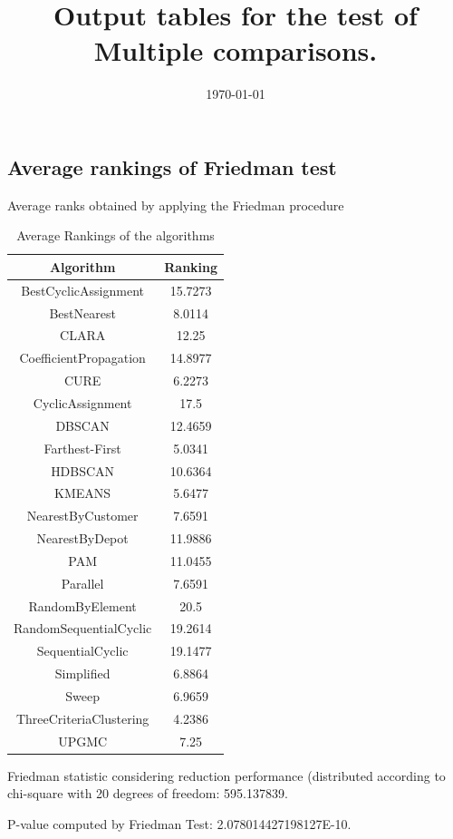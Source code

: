 \documentclass[a4paper,10pt]{article}
\title{Output tables for the test of Multiple comparisons.}
\author{}
\date{\today}
\begin{document}
\begin{landscape}
\pagestyle{empty}
\maketitle
\thispagestyle{empty}
\section{Average rankings of Friedman test}



Average ranks obtained by applying the Friedman procedure

\begin{table}[!htp]
\centering
\begin{tabular}{|c|c|}\hline
Algorithm&Ranking\\\hline
BestCyclicAssignment & 15.7273\\
BestNearest & 8.0114\\
CLARA & 12.25\\
CoefficientPropagation & 14.8977\\
CURE & 6.2273\\
CyclicAssignment & 17.5\\
DBSCAN & 12.4659\\
Farthest-First & 5.0341\\
HDBSCAN & 10.6364\\
KMEANS & 5.6477\\
NearestByCustomer & 7.6591\\
NearestByDepot & 11.9886\\
PAM & 11.0455\\
Parallel & 7.6591\\
RandomByElement & 20.5\\
RandomSequentialCyclic & 19.2614\\
SequentialCyclic & 19.1477\\
Simplified & 6.8864\\
Sweep & 6.9659\\
ThreeCriteriaClustering & 4.2386\\
UPGMC & 7.25\\
\hline
\end{tabular}
\caption{Average Rankings of the algorithms}
\end{table}

Friedman statistic considering reduction performance (distributed according to chi-square with 20 degrees of freedom: 595.137839.

P-value computed by Friedman Test: 2.078014427198127E-10.\newline


\end{landscape}
\end{document}
